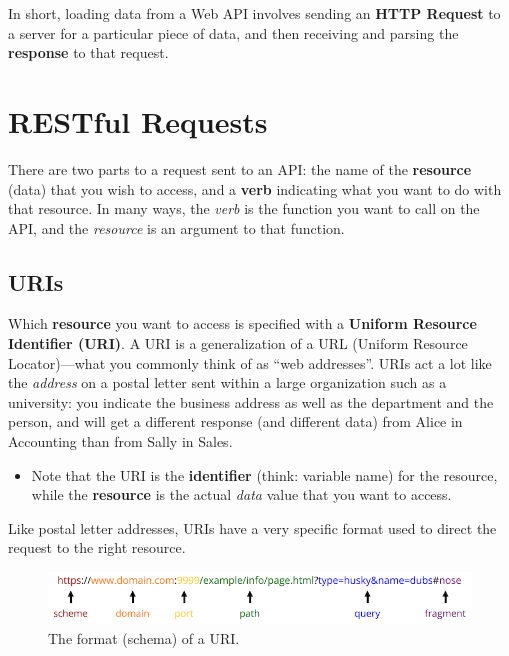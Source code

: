 \documentclass[]{book}
\providecommand{\tightlist}{%
  \setlength{\itemsep}{0pt}\setlength{\parskip}{0pt}}
\theoremstyle{definition}
\theoremstyle{definition}
\theoremstyle{remark}
\begin{document}
In short, loading data from a Web API involves sending an \textbf{HTTP
Request} to a server for a particular piece of data, and then receiving
and parsing the \textbf{response} to that request.

\section{RESTful Requests}\label{restful-requests}

There are two parts to a request sent to an API: the name of the
\textbf{resource} (data) that you wish to access, and a \textbf{verb}
indicating what you want to do with that resource. In many ways, the
\emph{verb} is the function you want to call on the API, and the
\emph{resource} is an argument to that function.

\subsection{URIs}\label{uris}

Which \textbf{resource} you want to access is specified with a
\textbf{Uniform Resource Identifier (URI)}. A URI is a generalization of
a URL (Uniform Resource Locator)---what you commonly think of as ``web
addresses''. URIs act a lot like the \emph{address} on a postal letter
sent within a large organization such as a university: you indicate the
business address as well as the department and the person, and will get
a different response (and different data) from Alice in Accounting than
from Sally in Sales.

\begin{itemize}
\tightlist
\item
  Note that the URI is the \textbf{identifier} (think: variable name)
  for the resource, while the \textbf{resource} is the actual
  \emph{data} value that you want to access.
\end{itemize}

Like postal letter addresses, URIs have a very specific format used to
direct the request to the right resource.

\begin{figure}
\centering
\includegraphics{img/apis/uri-schema.png}
\caption{The format (schema) of a URI.}
\end{figure}
\end{document}

